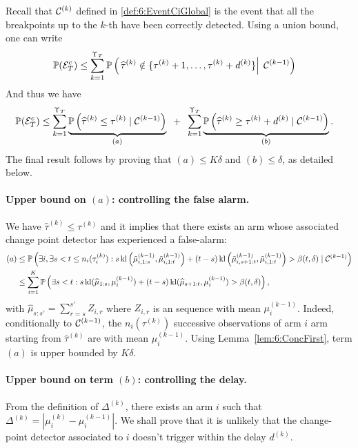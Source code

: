 Recall that $\mathcal{C}^{(k)}$ defined in \eqref{def:6:EventCiGlobal} is the event that all the breakpoints up to the $k$-th have been correctly detected.
Using a union bound, one can write
%
\begin{align*}
    \mathbb{P}(\mathcal{E}_T^c) & \leq \sum\limits_{k=1}^{\Upsilon_T}
    \mathbb{P}\left(\left. \widehat{\tau}^{(k)} \notin \{ \tau^{(k)}+1, \dots, \tau^{(k)} + d^{(k)} \} \right|\; \mathcal{C}^{(k-1)}\right)
\end{align*}
And thus we have
\begin{align*}
    \mathbb{P}(\mathcal{E}_T^c) & \leq \sum\limits_{k=1}^{\Upsilon_T} \underbrace{\mathbb{P}\left(\widehat{\tau}^{(k)} \leq \tau^{(k)} \;|\; \mathcal{C}^{(k-1)}\right)}_{(a)} \;\; + \;\; \sum\limits_{k=1}^{\Upsilon_T} \underbrace{\mathbb{P}\left(\widehat{\tau}^{(k)} \geq \tau^{(k)} + d^{(k)} \;|\; \mathcal{C}^{(k-1)}\right)}_{(b)}.
\end{align*}
%
The final result follows by proving that $(a) \leq K \delta$ and $(b)\leq \delta$, as detailed below.


\paragraph{Upper bound on $(a)$: controlling the false alarm.}
%
We have $\widehat{\tau}^{(k)} \leq \tau^{(k)}$ and it implies that there exists an arm whose associated change point detector has experienced a false-alarm:
%
\begin{align*}
    (a) & \leq \mathbb{P}\left(\exists i, \exists s < t \leq n_i(\tau_i^{(k)}) : s \, \mathrm{kl}\left(\tilde{\mu}_{i,1:s}^{(k-1)},\tilde{\mu}_{i,1:t}^{(k-1)}\right) + (t - s) \, \mathrm{kl}\left(\tilde{\mu}_{i,s+1:t}^{(k-1)},\tilde{\mu}_{i,1:t}^{(k-1)}\right) > \beta(t, \delta) \;|\; \mathcal{C}^{(k-1)}\right) \\
    & \leq \sum_{i=1}^K\mathbb{P}\left(\exists s < t : s \, \mathrm{kl}(\widehat{\mu}_{1:s},\mu_i^{(k-1)}) + (t - s) \, \mathrm{kl}(\widehat{\mu}_{s+1:t}, \mu_{i}^{(k-1)}) > \beta(t, \delta)\right),
\end{align*}
with $\hat\mu_{s:s'} = \sum_{r=s}^{s'} Z_{i,r}$ where $Z_{i,r}$ is an \iid{} sequence with mean $\mu_i^{(k-1)}$.
Indeed, conditionally to $\mathcal{C}^{(k-1)}$, the $n_i(\tau^{(k)})$ successive observations of arm $i$ arm starting from $\hat \tau^{(k)}$ are \iid{} with mean $\mu_i^{(k-1)}$.
Using Lemma~\ref{lem:6:ConcFirst}, term $(a)$ is upper bounded by $K\delta$.


\paragraph{Upper bound on term $(b)$: controlling the delay.}
%
From the definition of $\Delta^{(k)}$, there exists an arm $i$ such that $\Delta^{(k)} = |\mu_i^{(k)} - \mu_i^{(k-1)}|$. We shall prove that it is unlikely that the change-point detector associated to $i$ doesn't trigger within the delay $d^{(k)}$.

